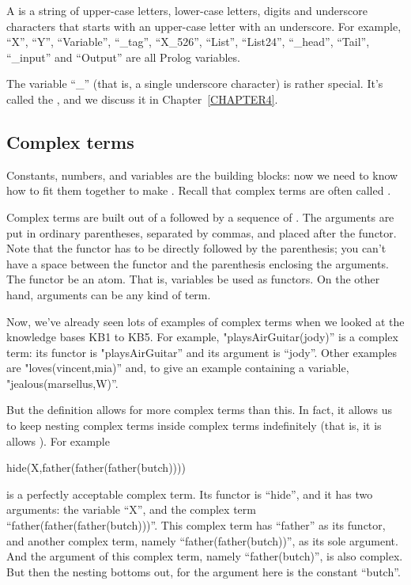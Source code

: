 A  is a string of upper-case letters, lower-case letters,
digits and underscore characters that starts  with an
upper-case letter  with an underscore.  For example, ``X'',
``Y'', ``Variable'', ``\_tag'', ``X\_526'',  ``List'', ``List24'', ``\_head'',
``Tail'', ``\_input'' and ``Output'' are all Prolog variables.

The variable ``\_'' (that is, a single underscore character) is rather
special.  It's called the , and we discuss
it in Chapter~\ref{CHAPTER4}.



\subsection*{Complex terms}\label{SUBSEC.L1.COMPLEX.TERMS}

Constants, numbers, and variables are the building blocks: now we need
to know how to fit them together to make .
Recall that complex terms are often called .

Complex terms are built out of a  followed by a
sequence of . The arguments are put in ordinary
parentheses, separated by commas, and placed after the functor. Note
that the functor has to be directly followed by the parenthesis; you
can't have a space between the functor and the parenthesis enclosing
the arguments. The functor  be an atom.  That is,
variables  be used as functors.  On the other hand,
arguments can be any kind of term.

Now, we've already seen lots of examples of complex terms when we
looked at the knowledge bases KB1 to KB5. For example,
"playsAirGuitar(jody)'' is a complex term: its functor is
"playsAirGuitar'' and its argument is ``jody''.  Other examples are
"loves(vincent,mia)'' and, to give an example containing a variable,
"jealous(marsellus,W)''.

But  the definition allows for  more complex terms than this.
In fact, it allows us to keep nesting complex terms inside complex
terms indefinitely (that is, it is allows  ).
For example
%
\begin{LPNcodedisplay}
hide(X,father(father(father(butch))))
\end{LPNcodedisplay}
%
is a perfectly acceptable complex term. Its functor is ``hide'', and it
has two arguments: the variable ``X'', and the complex term
``father(father(father(butch)))''. This complex term has ``father'' as its
functor, and another complex term, namely ``father(father(butch))'', as
its sole argument. And the argument of this complex term, namely
``father(butch)'', is also complex.  But then the nesting bottoms
out, for the argument here is the constant ``butch''.


